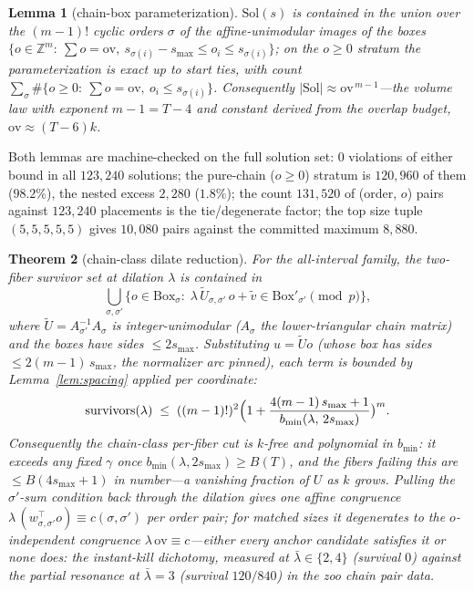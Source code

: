 \documentclass[11pt,a4paper]{article}
\numberwithin{equation}{section}
\theoremstyle{plain}
\newtheorem{theorem}{Theorem}[section]
\newtheorem{lemma}[theorem]{Lemma}
\theoremstyle{definition}
\theoremstyle{remark}
\newcommand{\Z}{\mathbb{Z}}
\begin{document}
\begin{lemma}[chain-box parameterization]\label{lem:chainbox}
$\mathrm{Sol}(s)$ is contained in the union over the $(m-1)!$ cyclic
orders $\sigma$ of the affine-unimodular images of the boxes
$\{o\in\Z^m:\ \sum o=\mathrm{ov},\ s_{\sigma(i)}-s_{\max}\le o_i\le
s_{\sigma(i)}\}$; on the $o\ge0$ stratum the parameterization is exact
up to start ties, with count
$\sum_\sigma\#\{o\ge0:\ \sum o=\mathrm{ov},\ o_i\le s_{\sigma(i)}\}$.
Consequently $|\mathrm{Sol}|\approx\mathrm{ov}^{\,m-1}$---the volume
law with exponent $m-1=T-4$ and constant derived from the overlap
budget, $\mathrm{ov}\approx(T-6)k$.
\end{lemma}

Both lemmas are machine-checked on the full solution set: $0$
violations of either bound in all $123{,}240$ solutions; the pure-chain
($o\ge0$) stratum is $120{,}960$ of them ($98.2\%$), the nested excess
$2{,}280$ ($1.8\%$); the count $131{,}520$ of (order, $o$) pairs
against $123{,}240$ placements is the tie/degenerate factor; the top
size tuple $(5,5,5,5,5)$ gives $10{,}080$ pairs against the committed
maximum $8{,}880$.

\begin{theorem}[chain-class dilate reduction]\label{thm:chaindilate}
For the all-interval family, the two-fiber survivor set at dilation
$\lambda$ is contained in
\[
\bigcup_{\sigma,\sigma'}\bigl\{o\in\mathrm{Box}_\sigma:\;
\lambda\,\tilde U_{\sigma,\sigma'}\,o+\tilde v\in
\mathrm{Box}'_{\sigma'}\pmod p\bigr\},
\]
where $\tilde U=A_{\sigma'}^{-1}A_\sigma$ is integer-unimodular
($A_\sigma$ the lower-triangular chain matrix) and the boxes have
sides $\le 2s_{\max}$. Substituting $u=\tilde Uo$ (whose box has sides
$\le 2(m{-}1)\,s_{\max}$, the normalizer arc pinned), each term is bounded by
Lemma~\ref{lem:spacing} applied per coordinate:
\[
\mathrm{survivors}(\lambda)\;\le\;((m-1)!)^2
\Bigl(1+\frac{4(m-1)\,s_{\max}+1}{b_{\min}(\lambda,\,2s_{\max})}\bigr)^{m}.
\]
Consequently the chain-class per-fiber cut is $k$-free and polynomial
in $b_{\min}$: it exceeds any fixed $\gamma$ once
$b_{\min}(\lambda,2s_{\max})\ge B(T)$, and the fibers failing this are
$\le B(4s_{\max}+1)$ in number---a vanishing fraction of $U$ as $k$
grows. Pulling the $\sigma'$-sum condition back through the dilation
gives one affine congruence
$\lambda\,(w^\top_{\sigma,\sigma'}o)\equiv c(\sigma,\sigma')$ per
order pair; for matched sizes it degenerates to the $o$-independent
congruence $\lambda\,\mathrm{ov}\equiv c$---either every anchor
candidate satisfies it or none does: the instant-kill dichotomy,
measured at $\bar\lambda\in\{2,4\}$ (survival $0$) against the partial
resonance at $\bar\lambda=3$ (survival $120/840$) in the zoo chain pair
data.
\end{theorem}
\end{document}
